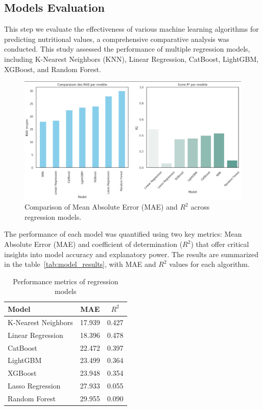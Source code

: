 \subsection{Models Evaluation}
\par This step we evaluate the effectiveness of various machine learning algorithms for predicting nutritional values, a comprehensive comparative analysis was conducted. This study assessed the performance of multiple regression models, including K-Nearest Neighbors (KNN), Linear Regression, CatBoost, LightGBM, XGBoost, and Random Forest.
\begin{figure}[H]
    \centering
    \includegraphics[width=0.9\linewidth]{images/mae_r2_comparison.png}
    \caption{Comparison of Mean Absolute Error (MAE) and \(R^2\) across regression models.}
    \label{fig:model_comparison}
\end{figure}

The performance of each model was quantified using two key metrics: Mean Absolute Error (MAE) and coefficient of determination ($R^2$) that offer critical insights into model accuracy and explanatory power. The results are summarized in the table~\ref{tab:model_results}, with MAE and \(R^2\) values for each algorithm.


\begin{table}[H]
    \centering
    \caption{Performance metrics of regression models}
    \begin{tabular}{lcc}
        \toprule
        \textbf{Model} & \textbf{MAE} & \textbf{\(R^2\)} \\
        \midrule
        K-Nearest Neighbors & 17.939 & 0.427 \\
        Linear Regression & 18.396 & 0.478 \\
        CatBoost & 22.472 & 0.397 \\
        LightGBM & 23.499 & 0.364 \\
        XGBoost & 23.948 & 0.354 \\
        Lasso Regression &  27.933 & 0.055 \\
        Random Forest & 29.955 & 0.090 \\
        \bottomrule
    \end{tabular}
\end{table}

